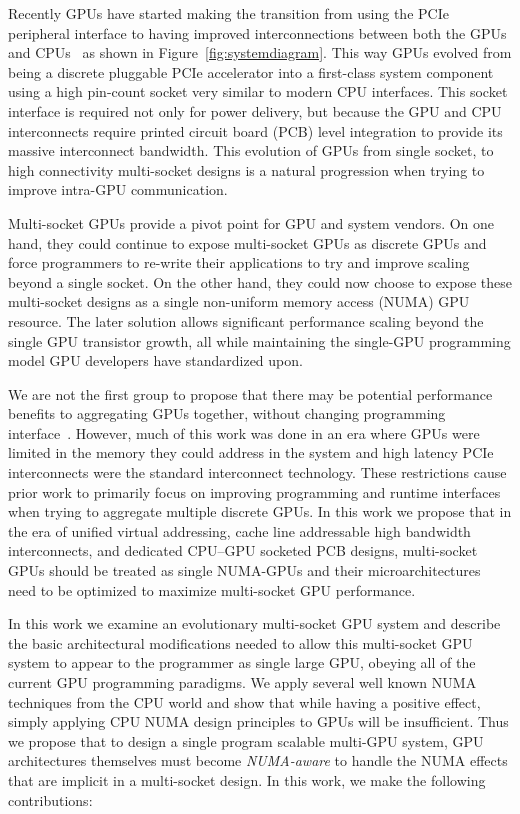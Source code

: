 Recently GPUs have started making the transition from using the PCIe peripheral 
interface to having improved interconnections between both the GPUs and 
CPUs~\cite{dgx,AMDINFINITYFABRIC} as shown in Figure~\ref{fig:systemdiagram}. 
This way GPUs evolved from being a discrete pluggable PCIe accelerator into a
first-class system component using a high pin-count socket very similar to
modern CPU interfaces.
This socket interface is required not only for power delivery, 
but because the GPU and CPU interconnects require printed
circuit board (PCB) level integration to provide its massive interconnect bandwidth.
This evolution of GPUs from single socket, to high connectivity multi-socket designs
is a natural progression when trying to improve intra-GPU communication.

Multi-socket GPUs provide a pivot point for GPU and system vendors. On one hand, they
could continue to expose multi-socket GPUs as discrete GPUs and force programmers
to re-write their applications to try and improve scaling beyond a single socket.
On the other hand, they could now choose to expose these multi-socket designs as
a single non-uniform memory access (NUMA) GPU resource. The later solution allows 
significant performance scaling beyond the single GPU transistor growth, all
while maintaining the single-GPU programming model GPU developers have standardized upon.

We are not the first group to propose that there may be potential performance
benefits to aggregating GPUs together, without changing programming
interface~\cite{Cabezas2015,lee2013transparent}. However, much of this work was
done in an era where GPUs were limited in the memory they could address in the
system and high latency PCIe interconnects were the standard interconnect
technology. These restrictions cause prior work to primarily focus on improving
programming and runtime interfaces when trying to aggregate multiple discrete
GPUs. In this work we propose that in the era of unified virtual addressing,
cache line addressable high bandwidth interconnects, and dedicated CPU--GPU
socketed PCB designs, multi-socket GPUs should be treated as single NUMA-GPUs
and their microarchitectures need to be optimized to maximize multi-socket GPU
performance.

In this work we examine an evolutionary multi-socket GPU system and describe the 
basic architectural modifications needed to allow this multi-socket GPU system to appear to the programmer
as single large GPU, obeying all of the current GPU programming paradigms. We apply 
several well known NUMA techniques from the CPU world and show that
while having a positive effect, simply applying CPU NUMA design principles to GPUs 
will be insufficient. Thus we propose that to design
a single program scalable multi-GPU system, GPU architectures themselves must become
\textit{NUMA-aware} to handle the NUMA effects that are implicit in a multi-socket
design. In this work, we make the following contributions:

